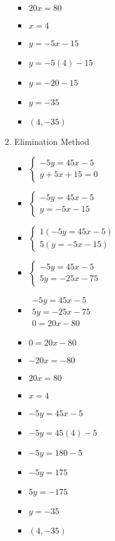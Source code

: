 \documentclass{article}
\begin{document}
\begin{enumerate}
\begin{enumerate}
\begin{itemize}
    \item $20x=80$
    \item $x=4$
    \item $y=-5x-15$
    \item $y=-5(4)-15$
    \item $y=-20-15$
    \item $y=-35$
    \item $(4,-35)$
    \end{itemize}
  \item Elimination Method
    \begin{itemize}
    \item $\left\{ \begin{array}{l}
          -5y=45x-5 \\
          y+5x+15=0 \end{array} \right.$
    \item $\left\{ \begin{array}{l}
          -5y=45x-5 \\
          y=-5x-15 \end{array} \right.$
    \item $\left\{ \begin{array}{l}
          1(-5y=45x-5) \\
          5(y=-5x-15) \end{array} \right.$
    \item $\left\{ \begin{array}{l}
          -5y=45x-5 \\
          5y=-25x-75 \end{array} \right.$
    \item $\begin{array}{l}
          -5y=45x-5 \\
          5y=-25x-75 \\ \hline
          0=20x-80 \end{array}$
    \item $0=20x-80$
    \item $-20x=-80$
    \item $20x=80$
    \item $x=4$
    \item $-5y=45x-5$
    \item $-5y=45(4)-5$
    \item $-5y=180-5$
    \item $-5y=175$
    \item $5y=-175$
    \item $y=-35$
    \item $(4,-35)$

\end{itemize}
\end{enumerate}
\end{enumerate}
\end{document}
